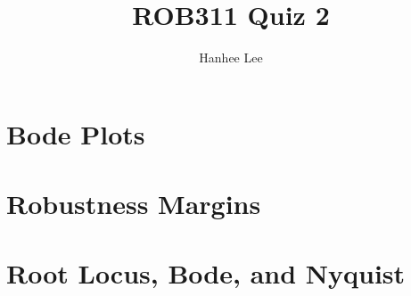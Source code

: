\documentclass{article}
\title{ROB311 Quiz 2}
\author{Hanhee Lee}
\begin{document}
\maketitle

\tableofcontents
\newpage

\section{Bode Plots}

\newpage

\section{Robustness Margins}

\newpage

\section{Root Locus, Bode, and Nyquist}

\newpage
\end{document}
